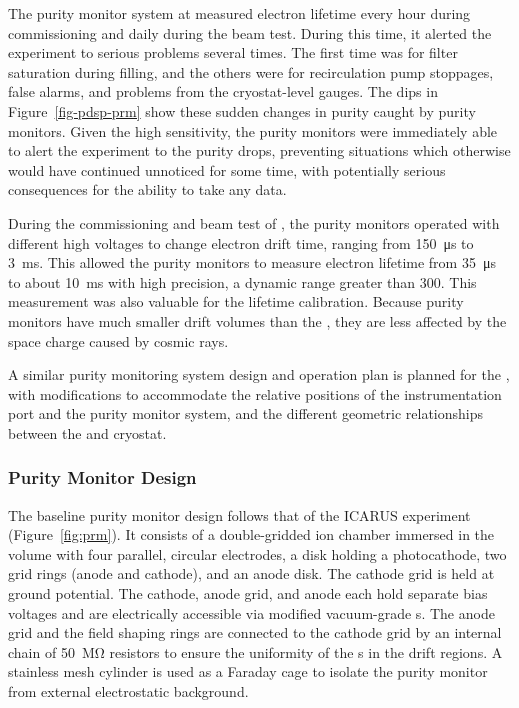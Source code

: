 The purity monitor system at  measured electron lifetime every hour during commissioning and daily during the beam test. During 
this time, it alerted the experiment to serious problems several times. The first time was for filter saturation during  filling, and the others were for recirculation pump stoppages, false alarms, and problems from the cryostat-level gauges.  The dips in Figure~\ref{fig-pdsp-prm} show these sudden changes in purity caught by purity monitors. 
Given the high sensitivity, the  purity monitors  were immediately able to alert the experiment to the purity drops, 
preventing situations which otherwise would have continued unnoticed for some time, with potentially serious consequences for the ability to take any data. 



During the commissioning and beam test of , the purity monitors operated with different high voltages to change electron drift time, ranging from \SI{150}{\micro\second} to \SI{3}{\milli\second}. This allowed the  purity monitors to measure electron lifetime from \SI{35}{\micro\second} to about \SI{10}{\milli\second} with high precision, a dynamic range greater than \num{300}. 
This measurement was also valuable for the  lifetime calibration. Because purity monitors have much smaller drift volumes than the , they are less affected by the space charge caused by cosmic rays. 

  A similar purity monitoring system design and operation plan is planned for %
  the , with modifications to accommodate the relative positions of the instrumentation port %
  and the purity monitor system, and the %
  different geometric relationships between the  and cryostat.





\subsubsection{Purity Monitor Design}


The  baseline purity monitor design follows that of  the ICARUS experiment (Figure~\ref{fig:prm})\cite{Adamowski:2014daa}.  It consists of a double-gridded ion chamber immersed in the  volume with four parallel, circular electrodes, a disk holding a photocathode, two grid rings (anode and cathode), and an anode disk. The cathode grid is held at ground potential. The cathode, anode grid, and anode 
each hold separate bias voltages and are electrically accessible via modified vacuum-grade  \fdth{}s. %
The anode grid and the field shaping rings are connected to the cathode grid by an internal chain of \SI{50}{\mega\ohm} resistors to ensure the uniformity of the \efield{}s in the drift regions. A stainless mesh cylinder is used as a Faraday cage to isolate the purity monitor from external electrostatic background. 

